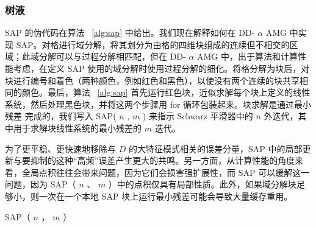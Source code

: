 \documentclass[5p,times,a4paper,fleqn]{cas-dc}
\begin{document}
   \subsubsection{树液  }     

SAP 的伪代码在算法~    \ref{alg:sap}    中给出。我们现在解释如何在 DD-    $
\alpha$    AMG 中实现 SAP。对格进行域分解，将其划分为由格的四维块组成的连续但不相交的区域；此域分解可以与过程分解相匹配，但在 DD-    $\alpha$    AMG 中，出于算法和计算性能考虑，在定义 SAP 使用的域分解时使用过程分解的细化。将格分解为块后，对块进行编号和着色（两种颜色，例如红色和黑色），以使没有两个连续的块共享相同的颜色。最后，算法~    \ref{alg:sap}    首先运行红色块，近似求解每个块上定义的线性系统，然后处理黑色块，并将这两个步骤用 for 循环包装起来。块求解是通过最小残差    \cite{saad2003iterative}    完成的，我们写入 SAP(   $n$   ,    $m$   ) 来指示 Schwarz 平滑器中的    $n$    外迭代，其中用于求解块线性系统的最小残差的    $m$    迭代。  

为了更平稳、更快速地移除与    $D$    的大特征模式相关的误差分量，SAP 中的局部更新与要抑制的这种“高频”误差产生更大的共鸣。另一方面，从计算性能的角度来看，全局点积往往会带来问题，因为它们会损害强扩展性，而 SAP 可以缓解这一问题，因为 SAP（   $n$   、   $m$   ）中的点积仅具有局部性质。此外，如果域分解块足够小，则一次在一个本地 SAP 块上运行最小残差可能会导致大量缓存重用。  

   \begin{algorithm}
\caption{SAP（   $n$   ，   $m$   ）  } \label{alg:sap}
\end{algorithm}     
\end{document}
